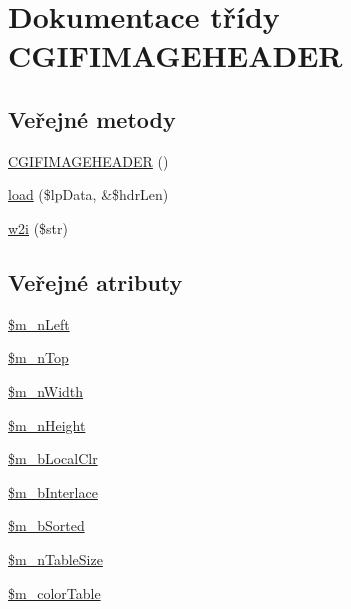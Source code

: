 \hypertarget{class_c_g_i_f_i_m_a_g_e_h_e_a_d_e_r}{\section{Dokumentace třídy C\-G\-I\-F\-I\-M\-A\-G\-E\-H\-E\-A\-D\-E\-R}
\label{class_c_g_i_f_i_m_a_g_e_h_e_a_d_e_r}
}
\subsection*{Veřejné metody}
\begin{DoxyCompactItemize}
\item 
\hyperlink{class_c_g_i_f_i_m_a_g_e_h_e_a_d_e_r_a8b932ef1bb7cbb9e49d13f1d10aa1f82}{C\-G\-I\-F\-I\-M\-A\-G\-E\-H\-E\-A\-D\-E\-R} ()
\item 
\hyperlink{class_c_g_i_f_i_m_a_g_e_h_e_a_d_e_r_aff71b4a1a5e2ce25172f0a522b863ae4}{load} (\$lp\-Data, \&\$hdr\-Len)
\item 
\hyperlink{class_c_g_i_f_i_m_a_g_e_h_e_a_d_e_r_af045ad055da30b4a63e5d620afa2c1c9}{w2i} (\$str)
\end{DoxyCompactItemize}
\subsection*{Veřejné atributy}
\begin{DoxyCompactItemize}
\item 
\hyperlink{class_c_g_i_f_i_m_a_g_e_h_e_a_d_e_r_ac2e5fb60ea2d46594c818c5e507aa58f}{\$m\-\_\-n\-Left}
\item 
\hyperlink{class_c_g_i_f_i_m_a_g_e_h_e_a_d_e_r_a65eb5b6d36ba1b7b2f781bc58918992c}{\$m\-\_\-n\-Top}
\item 
\hyperlink{class_c_g_i_f_i_m_a_g_e_h_e_a_d_e_r_acd756cc46a06841324c277da1c197d66}{\$m\-\_\-n\-Width}
\item 
\hyperlink{class_c_g_i_f_i_m_a_g_e_h_e_a_d_e_r_a9556503639b3b401e04d7779593326ea}{\$m\-\_\-n\-Height}
\item 
\hyperlink{class_c_g_i_f_i_m_a_g_e_h_e_a_d_e_r_aeb7f65e7af68573b9bc05619b42e4bc1}{\$m\-\_\-b\-Local\-Clr}
\item 
\hyperlink{class_c_g_i_f_i_m_a_g_e_h_e_a_d_e_r_a64f0b65ab5755305f65e1c8e6397130c}{\$m\-\_\-b\-Interlace}
\item 
\hyperlink{class_c_g_i_f_i_m_a_g_e_h_e_a_d_e_r_a16ada1244f85b4a1eba2fa95a0108022}{\$m\-\_\-b\-Sorted}
\item 
\hyperlink{class_c_g_i_f_i_m_a_g_e_h_e_a_d_e_r_ae5f06300d37055e834eb0a2a157beaa8}{\$m\-\_\-n\-Table\-Size}
\item 
\hyperlink{class_c_g_i_f_i_m_a_g_e_h_e_a_d_e_r_a4257d045d29c62aae5c985e212ab0d70}{\$m\-\_\-color\-Table}
\end{DoxyCompactItemize}


